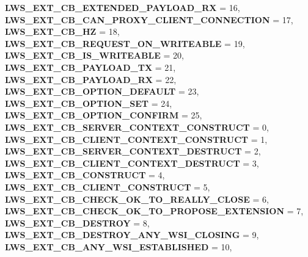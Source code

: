 \begin{DoxyCompactItemize}
{\bfseries L\+W\+S\+\_\+\+E\+X\+T\+\_\+\+C\+B\+\_\+\+E\+X\+T\+E\+N\+D\+E\+D\+\_\+\+P\+A\+Y\+L\+O\+A\+D\+\_\+\+RX} = 16, 
{\bfseries L\+W\+S\+\_\+\+E\+X\+T\+\_\+\+C\+B\+\_\+\+C\+A\+N\+\_\+\+P\+R\+O\+X\+Y\+\_\+\+C\+L\+I\+E\+N\+T\+\_\+\+C\+O\+N\+N\+E\+C\+T\+I\+ON} = 17, 
\newline
{\bfseries L\+W\+S\+\_\+\+E\+X\+T\+\_\+\+C\+B\+\_\+HZ} = 18, 
{\bfseries L\+W\+S\+\_\+\+E\+X\+T\+\_\+\+C\+B\+\_\+\+R\+E\+Q\+U\+E\+S\+T\+\_\+\+O\+N\+\_\+\+W\+R\+I\+T\+E\+A\+B\+LE} = 19, 
{\bfseries L\+W\+S\+\_\+\+E\+X\+T\+\_\+\+C\+B\+\_\+\+I\+S\+\_\+\+W\+R\+I\+T\+E\+A\+B\+LE} = 20, 
{\bfseries L\+W\+S\+\_\+\+E\+X\+T\+\_\+\+C\+B\+\_\+\+P\+A\+Y\+L\+O\+A\+D\+\_\+\+TX} = 21, 
\newline
{\bfseries L\+W\+S\+\_\+\+E\+X\+T\+\_\+\+C\+B\+\_\+\+P\+A\+Y\+L\+O\+A\+D\+\_\+\+RX} = 22, 
{\bfseries L\+W\+S\+\_\+\+E\+X\+T\+\_\+\+C\+B\+\_\+\+O\+P\+T\+I\+O\+N\+\_\+\+D\+E\+F\+A\+U\+LT} = 23, 
{\bfseries L\+W\+S\+\_\+\+E\+X\+T\+\_\+\+C\+B\+\_\+\+O\+P\+T\+I\+O\+N\+\_\+\+S\+ET} = 24, 
{\bfseries L\+W\+S\+\_\+\+E\+X\+T\+\_\+\+C\+B\+\_\+\+O\+P\+T\+I\+O\+N\+\_\+\+C\+O\+N\+F\+I\+RM} = 25, 
\newline
{\bfseries L\+W\+S\+\_\+\+E\+X\+T\+\_\+\+C\+B\+\_\+\+S\+E\+R\+V\+E\+R\+\_\+\+C\+O\+N\+T\+E\+X\+T\+\_\+\+C\+O\+N\+S\+T\+R\+U\+CT} = 0, 
{\bfseries L\+W\+S\+\_\+\+E\+X\+T\+\_\+\+C\+B\+\_\+\+C\+L\+I\+E\+N\+T\+\_\+\+C\+O\+N\+T\+E\+X\+T\+\_\+\+C\+O\+N\+S\+T\+R\+U\+CT} = 1, 
{\bfseries L\+W\+S\+\_\+\+E\+X\+T\+\_\+\+C\+B\+\_\+\+S\+E\+R\+V\+E\+R\+\_\+\+C\+O\+N\+T\+E\+X\+T\+\_\+\+D\+E\+S\+T\+R\+U\+CT} = 2, 
{\bfseries L\+W\+S\+\_\+\+E\+X\+T\+\_\+\+C\+B\+\_\+\+C\+L\+I\+E\+N\+T\+\_\+\+C\+O\+N\+T\+E\+X\+T\+\_\+\+D\+E\+S\+T\+R\+U\+CT} = 3, 
\newline
{\bfseries L\+W\+S\+\_\+\+E\+X\+T\+\_\+\+C\+B\+\_\+\+C\+O\+N\+S\+T\+R\+U\+CT} = 4, 
{\bfseries L\+W\+S\+\_\+\+E\+X\+T\+\_\+\+C\+B\+\_\+\+C\+L\+I\+E\+N\+T\+\_\+\+C\+O\+N\+S\+T\+R\+U\+CT} = 5, 
{\bfseries L\+W\+S\+\_\+\+E\+X\+T\+\_\+\+C\+B\+\_\+\+C\+H\+E\+C\+K\+\_\+\+O\+K\+\_\+\+T\+O\+\_\+\+R\+E\+A\+L\+L\+Y\+\_\+\+C\+L\+O\+SE} = 6, 
{\bfseries L\+W\+S\+\_\+\+E\+X\+T\+\_\+\+C\+B\+\_\+\+C\+H\+E\+C\+K\+\_\+\+O\+K\+\_\+\+T\+O\+\_\+\+P\+R\+O\+P\+O\+S\+E\+\_\+\+E\+X\+T\+E\+N\+S\+I\+ON} = 7, 
\newline
{\bfseries L\+W\+S\+\_\+\+E\+X\+T\+\_\+\+C\+B\+\_\+\+D\+E\+S\+T\+R\+OY} = 8, 
{\bfseries L\+W\+S\+\_\+\+E\+X\+T\+\_\+\+C\+B\+\_\+\+D\+E\+S\+T\+R\+O\+Y\+\_\+\+A\+N\+Y\+\_\+\+W\+S\+I\+\_\+\+C\+L\+O\+S\+I\+NG} = 9, 
{\bfseries L\+W\+S\+\_\+\+E\+X\+T\+\_\+\+C\+B\+\_\+\+A\+N\+Y\+\_\+\+W\+S\+I\+\_\+\+E\+S\+T\+A\+B\+L\+I\+S\+H\+ED} = 10, 

\end{DoxyCompactItemize}
